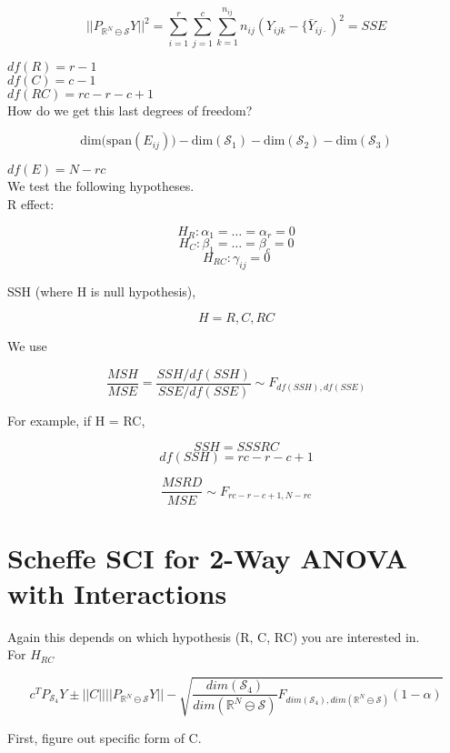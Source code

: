 \documentclass[11pt,fleqn]{book} %
\begin{document}
		$$||P_{\mathbb{R}^N\ominus \mathcal{S}} Y||^2 = \sum^r_{i=1} \sum^c_{j=1} \sum^{n_{ij}}_{k=1} n_{ij}   (Y_{ij k} - \{\bar{Y}_{ij \cdot})^2 = SSE$$


$df(R) = r- 1$\\
$df(C) = c - 1$\\
$df(RC) = rc - r - c + 1$\\


How do we get this last degrees of freedom? 

	$$\text{dim(span}(E_{ij})) - \text{dim}(\mathcal{S}_1) - \text{dim} (\mathcal{S}_2 ) -  \text{dim}(\mathcal{S}_3) $$


$df(E) = N - rc$\\


We test the following hypotheses. \\

R effect:

		$$H_R: \alpha_1 = \dots = \alpha_r = 0$$
		$$H_C: \beta_1 = \dots = \beta_c = 0$$
		$$H_{RC}: \gamma_{ij} = 0$$


SSH (where H is null hypothesis), 

		$$H = R, C, RC$$

We use

		$$\frac{MSH}{MSE} = \frac{SSH/df(SSH)}{SSE/df(SSE)} \sim F_{df(SSH), df(SSE)} $$

For example, if H = RC, 

		$$SSH = SSSRC $$
		$$df(SSH) = rc - r - c +1$$

		$$\frac{MSRD}{MSE} \sim F_{rc - r - c + 1, N - rc}$$




\section{Scheffe SCI for 2-Way ANOVA with Interactions}


Again this depends on which hypothesis (R, C, RC) you are interested in. \\

For $H_{RC}$

		$$c^T P_{\mathcal{S}_4} Y \pm ||C|| ||P_{\mathbb{R}^N \ominus \mathcal{S}} Y || - \sqrt{\frac{dim(\mathcal{S}_4)}{dim(\mathbb{R}^N \ominus \mathcal{S})} F_{dim(\mathcal{S}_4), dim(\mathbb{R}^N \ominus \mathcal{S})}(1 - \alpha)} $$


First, figure out specific form of C.\\
\end{document}
